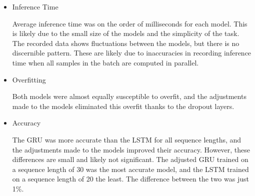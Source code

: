 \documentclass{article}
\begin{document}
\begin{enumerate}[label=1\alph*. ]
\begin{itemize}
        \item Inference Time
        
            Average inference time was on the order of
            milliseconds for each model. This is likely due
            to the small size of the models and the
            simplicity of the task. The recorded data shows
            fluctuations between the models, but there is no
            discernible pattern. These are likely due to
            inaccuracies in recording inference time when
            all samples in the batch are computed in
            parallel.

        \item Overfitting 
        
            Both models were almost equally
            susceptible to overfit, and the adjustments made
            to the models eliminated this overfit thanks to
            the dropout layers.
        
        \item Accuracy
        
            The GRU was more accurate than the LSTM for all
            sequence lengths, and the adjustments made to
            the models improved their accuracy. However,
            these differences are small and likely not
            significant. The adjusted GRU trained on a
            sequence length of 30 was the most accurate
            model, and the LSTM trained on a sequence length
            of 20 the least. The difference between the two
            was just 1\%.

    
    \end{itemize}

\end{enumerate}
\end{document}
